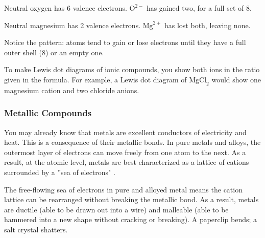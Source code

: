 \begin{Worked}
\begin{Solution}
Neutral oxygen has 6 valence electrons. $\text{O}^{2-}$ has gained two, for a full set of 8. 
\begin{center}
\end{center}

Neutral magnesium has 2 valence electrons. $\text{Mg}^{2+}$ has lost both, leaving none. 
\begin{center}
\end{center}
\end{Solution}
\end{Worked}

Notice the pattern: atoms tend to gain or lose electrons until they have a full outer shell (8) or an empty one.

To make Lewis dot diagrams of ionic compounds, you show both ions in the ratio 
given in the formula. For example, a Lewis dot diagram of $\text{MgCl}_2$ would 
show one magnesium cation and two chloride anions. 

\subsubsection{Metallic Compounds}
You may already know that metals are excellent conductors 
of electricity and heat. This is a consequence of their metallic bonds. In pure 
metals and alloys, the outermost layer of electrons can move freely from one atom 
to the next. As a result, at the atomic level, metals are best characterized as a 
lattice of cations surrounded by a ''sea of electrons" .

The free-flowing sea of electrons in pure and alloyed metal means the cation 
lattice can be rearranged without breaking the metallic bond. As a result, metals 
are ductile (able to be drawn out into a wire) and malleable (able to be hammered 
into a new shape without cracking or breaking). A paperclip bends; a salt crystal shatters.

